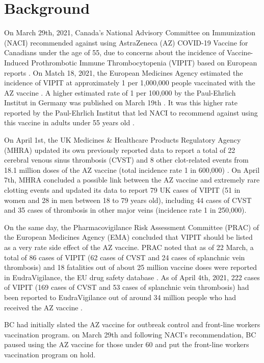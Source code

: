 \documentclass[]{interact}
\theoremstyle{plain}%
\theoremstyle{definition}
\theoremstyle{remark}
\begin{document}
\hypertarget{background}{%
\section{Background}\label{background}}

On March 29th, 2021, Canada's National Advisory Committee on
Immunization (NACI) recommended against using AstraZeneca (AZ) COVID-19
Vaccine for Canadians under the age of 55, due to concerns about the
incidence of Vaccine-Induced Prothrombotic Immune Thrombocytopenia
(VIPIT) based on European reports \citep{naci_naci_2021}. On Match 18,
2021, the European Medicines Agency estimated the incidence of VIPIT at
approximately 1 per 1,000,000 people vaccinated with the AZ vaccine
\citep{ema_covid-19_2021}. A higher estimated rate of 1 per 100,000 by
the Paul-Ehrlich Institut in Germany was published on March 19th
\citep{pei_covid-19_2021}. It was this higher rate reported by the
Paul-Ehrlich Institut that led NACI to recommend against using this
vaccine in adults under 55 years old \citep{naci_naci_2021}.

On April 1st, the UK Medicines \& Healthcare Products Regulatory Agency
(MHRA) updated its own previously reported data to report a total of 22
cerebral venous sinus thrombosis (CVST) and 8 other clot-related events
from 18.1 million doses of the AZ vaccine (total incidence rate 1 in
600,000) \citep{mhra_coronavirus_2021}. On April 7th, MHRA concluded a
possible link between the AZ vaccine and extremely rare clotting events
and updated its data to report 79 UK cases of VIPIT (51 in women and 28
in men between 18 to 79 years old), including 44 cases of CVST and 35
cases of thrombosis in other major veins (incidence rate 1 in
250,000)\citep{mhra_mhra_2021}.

On the same day, the Pharmacovigilance Risk Assessment Committee (PRAC)
of the European Medicines Agency (EMA) concluded that VIPIT should be
listed as a very rate side effect of the AZ vaccine. PRAC noted that as
of 22 March, a total of 86 cases of VIPIT (62 cases of CVST and 24 cases
of splanchnic vein thrombosis) and 18 fatalities out of about 25 million
vaccine doses were reported in EudraVigilance, the EU drug safety
database \citep{ema_astrazenecas_2021}. As of April 4th, 2021, 222 cases
of VIPIT (169 cases of CVST and 53 cases of splanchnic vein thrombosis)
had been reported to EudraVigilance out of around 34 million people who
had received the AZ vaccine \citep{ema_astrazenecas_2021}.

BC had initially slated the AZ vaccine for outbreak control and
front-line workers vaccination program. on March 29th and following
NACI's recommendation, BC paused using the AZ vaccine for those under 60
and put the front-line workers vaccination program on hold.
\end{document}
